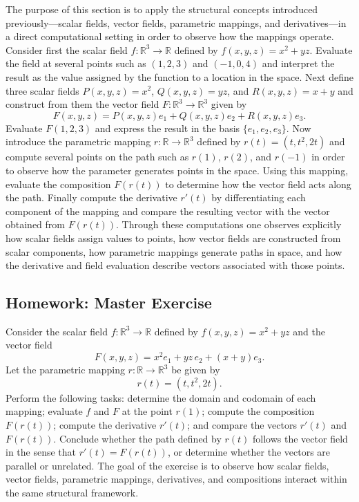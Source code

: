 \documentclass{article}
\begin{document}
    The purpose of this section is to apply the structural concepts introduced previously—scalar fields, vector fields, parametric mappings, and derivatives—in a direct computational setting in order to observe how the mappings operate. Consider first the scalar field $f:\mathbb{R}^3\to\mathbb{R}$ defined by $f(x,y,z)=x^2+yz$. Evaluate the field at several points such as $(1,2,3)$ and $(-1,0,4)$ and interpret the result as the value assigned by the function to a location in the space. Next define three scalar fields $P(x,y,z)=x^2$, $Q(x,y,z)=yz$, and $R(x,y,z)=x+y$ and construct from them the vector field $F:\mathbb{R}^3\to\mathbb{R}^3$ given by
    \[
    F(x,y,z)=P(x,y,z)e_1+Q(x,y,z)e_2+R(x,y,z)e_3.
    \]
    Evaluate $F(1,2,3)$ and express the result in the basis $\{e_1,e_2,e_3\}$. Now introduce the parametric mapping $r:\mathbb{R}\to\mathbb{R}^3$ defined by $r(t)=(t,t^2,2t)$ and compute several points on the path such as $r(1)$, $r(2)$, and $r(-1)$ in order to observe how the parameter generates points in the space. Using this mapping, evaluate the composition $F(r(t))$ to determine how the vector field acts along the path. Finally compute the derivative $r'(t)$ by differentiating each component of the mapping and compare the resulting vector with the vector obtained from $F(r(t))$. Through these computations one observes explicitly how scalar fields assign values to points, how vector fields are constructed from scalar components, how parametric mappings generate paths in space, and how the derivative and field evaluation describe vectors associated with those points.
    
    \subsection*{Homework: Master Exercise}
    
    Consider the scalar field $f:\mathbb{R}^3\to\mathbb{R}$ defined by $f(x,y,z)=x^2+yz$ and the vector field
    \[
    F(x,y,z)=x^2e_1+yz\,e_2+(x+y)e_3.
    \]
    Let the parametric mapping $r:\mathbb{R}\to\mathbb{R}^3$ be given by
    \[
    r(t)=(t,t^2,2t).
    \]
    Perform the following tasks: determine the domain and codomain of each mapping; evaluate $f$ and $F$ at the point $r(1)$; compute the composition $F(r(t))$; compute the derivative $r'(t)$; and compare the vectors $r'(t)$ and $F(r(t))$. Conclude whether the path defined by $r(t)$ follows the vector field in the sense that $r'(t)=F(r(t))$, or determine whether the vectors are parallel or unrelated. The goal of the exercise is to observe how scalar fields, vector fields, parametric mappings, derivatives, and compositions interact within the same structural framework.
\end{document}
